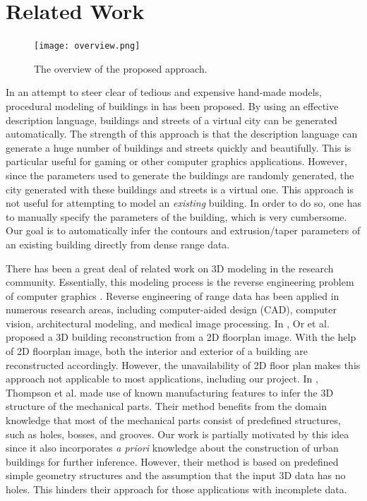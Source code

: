 \documentclass{acmsiggraph}                     %
\begin{document}
\section{Related Work}

\begin{figure}[htbp]
\begin{center}
\texttt{[image: overview.png]}
\end{center}
\caption{The overview of the proposed approach.}
\label{fig:ov}
\end{figure}

In an attempt to steer clear of tedious and expensive hand-made models,
procedural modeling of buildings in \cite{PMB_MWH,PMB_WWS,PMB_PM} has been proposed.
By using an effective description language, buildings and streets of a virtual
city can be generated automatically.
The strength of this approach is that the description language can generate
a huge number of buildings and streets quickly and beautifully.
This is particular useful for gaming or other computer graphics applications.
However, since the parameters used to generate the buildings are randomly
generated, the city generated with these buildings and streets is a virtual one.
This approach is not useful for attempting to model an {\it existing} building.
In order to do so, one has to manually specify the parameters of the building,
which is very cumbersome.
Our goal is to automatically infer the contours and extrusion/taper parameters
of an existing building directly from dense range data.

There has been a great deal of related work on 3D modeling in the research
community.
Essentially, this modeling process is the reverse engineering problem
of computer graphics \cite{RE_Fisher,RE_CLF,RE_CD}.
Reverse engineering of range data has been applied in numerous research areas,
including computer-aided design (CAD), computer vision, architectural modeling,
and medical image processing.
In \cite{DP_OWYC}, Or et al. proposed a 3D building reconstruction from a 2D floorplan image.
With the help of 2D
floorplan image, both the interior and exterior of a building are reconstructed accordingly.
However, the unavailability of 2D floor plan makes this approach not applicable to most applications,
including our project.
In \cite{RE_TOGSH}, Thompson et al. made use of known manufacturing features
to infer the 3D structure of the mechanical parts.
Their method benefits from the domain knowledge that most of the mechanical
parts consist of predefined structures, such as holes, bosses, and grooves.
Our work is partially motivated by this idea since it also incorporates
{\it a priori} knowledge about the construction of urban buildings for further
inference.
However, their method is based on predefined simple geometry structures and
the assumption that the input 3D data has no holes.
This hinders their approach for those applications with incomplete data.
\end{document}
